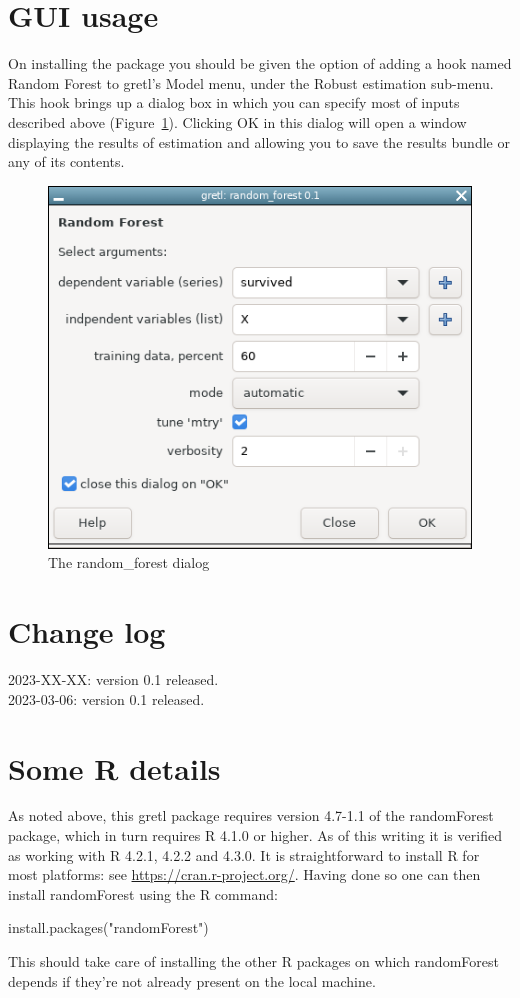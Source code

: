 \documentclass{article}
\begin{document}
\section{GUI usage}

On installing the package you should be given the option of adding a
hook named \textsf{Random Forest} to gretl's \textsf{Model} menu,
under the \textsf{Robust estimation} sub-menu. This hook brings up a
dialog box in which you can specify most of inputs described above
(Figure~\ref{fig:dialog}). Clicking \textsf{OK} in this dialog will
open a window displaying the results of estimation and allowing you to
save the results bundle or any of its contents.

\begin{figure}[htbp]
  \centering
  \includegraphics[scale=0.6]{rfgui.png}
  \caption{The random\_forest dialog}
  \label{fig:dialog}
\end{figure}

\section{Change log}

2023-XX-XX: version 0.1 released.\\[4pt]
2023-03-06: version 0.1 released.

\section{Some \textsf{R} details}
\label{sec:Rdetails}

As noted above, this gretl package requires version 4.7-1.1 of the
\textsf{randomForest} package, which in turn requires \textsf{R} 4.1.0
or higher. As of this writing it is verified as working with
\textsf{R} 4.2.1, 4.2.2 and 4.3.0. It is straightforward to install
\textsf{R} for most platforms: see
\url{https://cran.r-project.org/}. Having done so one can then install
\textsf{randomForest} using the \textsf{R} command:
\begin{code}
install.packages("randomForest")
\end{code}
This should take care of installing the other \textsf{R} packages on
which \textsf{randomForest} depends if they're not already present on
the local machine.
\end{document}
